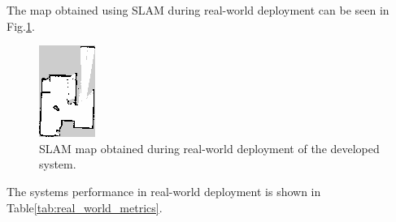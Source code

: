 
The map obtained using SLAM during real-world deployment can be seen in Fig.\:\ref{fig:real_world_slam_map}.
\begin{figure}
    \centering
    \includegraphics[width=\columnwidth]{images/real_world_SLAM_map.png}
    \caption{SLAM map obtained during real-world deployment of the developed system.}
    \label{fig:real_world_slam_map}
\end{figure}
The systems performance in real-world deployment is shown in Table\:\ref{tab:real_world_metrics}.
\begin{table}
    \centering
    \caption{Evaluation metrics obtained during real-world deployment and testing of the system.}
    \label{tab:real_world_metrics}
\end{table}


